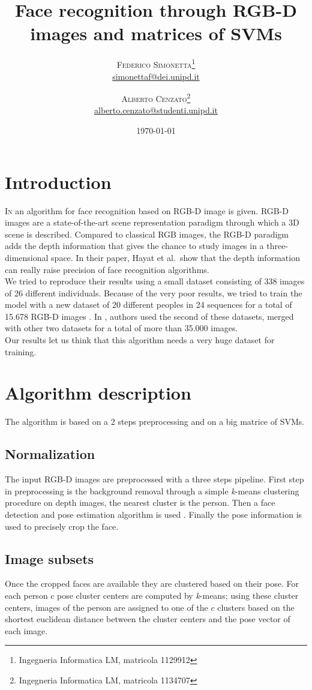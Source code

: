 \documentclass{article}
\title{Face recognition through RGB-D images and matrices of SVMs} %
\author{%
	\textsc{Federico Simonetta}\thanks{Ingegneria Informatica LM, matricola 1129912} \\[1ex] %
	\normalsize \href{mailto:simonettaf@dei.unipd.it}{simonettaf@dei.unipd.it} %
	\and %
	\textsc{Alberto Cenzato}\thanks{Ingegneria Informatica LM, matricola 1134707} \\[1ex] %
	\normalsize \href{mailto:alberto.cenzato@studenti.unipd.it}{alberto.cenzato@studenti.unipd.it} %
}
\date{\today} %
\begin{document}
\Huge
\bfseries
\maketitle
\mdseries
\normalsize

\section{Introduction}

\lettrine[nindent=0em,lines=2]{I}n \citep{Hayat2016} an algorithm for face
recognition based on RGB-D image is given. RGB-D images are a state-of-the-art
scene representation paradigm through which a 3D scene is described. Compared to
classical RGB images, the RGB-D paradigm adds the depth information that gives
the chance to study images in a three-dimensional space. In their paper, Hayat
et al.\ show that the depth information can really raise precision of face
recognition algorithms.
\\
We tried to reproduce their results using a small dataset consisting of 338
images of 26 different individuals. Because of the very poor results, we tried to
train the model with a new dataset of 20 different peoples in 24 sequences for
a total of 15.678 RGB-D images \citep{Fanelli2013}. In \citep{Hayat2016}, authors used the
second of these datasets, merged with other two datasets for a total of more
than 35.000 images.  \\ Our results let us think that this algorithm needs a
very huge dataset for training.

\section{Algorithm description}
The algorithm is based on a 2 steps preprocessing and on a big matrice of SVMs.

\subsection{Normalization}
The input RGB-D images are preprocessed with a three steps pipeline. First step in preprocessing is the background removal through a simple \textit{k}-means clustering procedure on depth images, the nearest cluster is the person. Then a face detection and pose estimation algorithm is used \citep{Fanelli2013}. Finally the pose information is used to precisely crop the face.

\subsection{Image subsets}
Once the cropped faces are available they are clustered based on their pose. For each person $c$ pose cluster centers are computed by \textit{k}-means; using these cluster centers, images of the person are assigned to one of the $c$ clusters based on the shortest euclidean distance between the cluster centers and the pose vector of each image.
\end{document}
